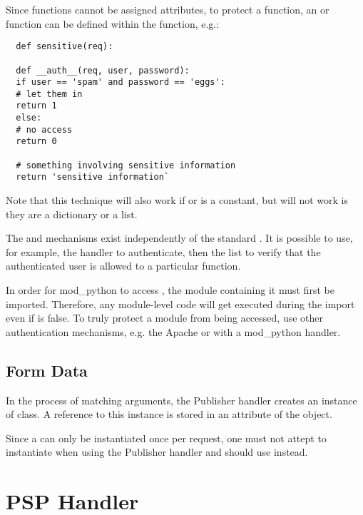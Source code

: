 Since functions cannot be assigned attributes, to protect a function,
an  or  function can be defined within
the function, e.g.:

\begin{verbatim}
  def sensitive(req):

  def __auth__(req, user, password):
  if user == 'spam' and password == 'eggs':
  # let them in
  return 1
  else:
  # no access
  return 0

  # something involving sensitive information
  return 'sensitive information`
\end{verbatim}

Note that this technique will also work if  or
 is a constant, but will not work is they are
a dictionary or a list. 

The  and  mechanisms exist
independently of the standard 
. It
is possible to use, for example, the handler to authenticate, then the
 list to verify that the authenticated user is
allowed to a particular function. 

\begin{notice}In order for mod_python to access ,
the module containing it must first be imported. Therefore, any
module-level code will get executed during the import even if
 is false.  To truly protect a module from
being accessed, use other authentication mechanisms, e.g. the Apache
 or with a mod_python  handler.
\end{notice}
     
\subsection{Form Data}

In the process of matching arguments, the Publisher handler creates an
instance of 
class. A reference to this instance is stored in an attribute 
of the  object.

Since a  can only be instantiated once per
request, one must not attept to instantiate  when
using the Publisher handler and should use
 instead.


\section{PSP Handler\label{hand-psp}}

